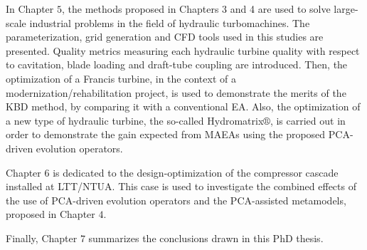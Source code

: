 In Chapter $5$, the methods proposed in Chapters 3 and 4 are used to solve large-scale industrial problems in the field of hydraulic turbomachines. The parameterization, grid generation and CFD tools used in this studies are presented. Quality metrics measuring each hydraulic turbine quality with respect to cavitation, blade loading and draft-tube coupling are introduced. Then, the optimization of a Francis turbine, in the context of a modernization/rehabilitation project, is used to demonstrate the merits of the KBD method, by comparing it with a conventional EA. Also, the optimization of a new type of hydraulic turbine, the so-called Hydromatrix$\circledR$, is carried out in order to demonstrate the gain expected from MAEAs using the proposed PCA-driven evolution operators.

Chapter $6$ is dedicated to the design-optimization of the compressor cascade installed at LTT/NTUA. This case is used to investigate the combined effects of the use of PCA-driven evolution operators and the PCA-assisted metamodels,  proposed in Chapter $4$.

Finally, Chapter $7$ summarizes the conclusions drawn in this PhD thesis.      









